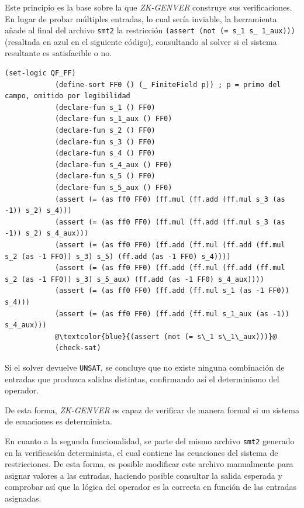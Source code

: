 \documentclass[a4paper,12pt]{report}
\begin{document}
	\vspace{0.2cm}
	\noindent Este principio es la base sobre la que \textit{ZK-GENVER} construye sus verificaciones. En lugar de probar múltiples entradas, lo cual sería inviable, la herramienta añade al final del archivo \texttt{smt2} la restricción \texttt{(assert (not (= s\_1 s\_ 1\_aux)))} (resaltada en azul en el siguiente código), consultando al solver si el sistema resultante es satisfacible o no.
	
	\begin{mi_ejemplo}
		\caption{Archivo \texttt{smt2} generado por el operador \texttt{Igual}}
		\label{lst:smt2-igual-determinista}
		
		\begin{lstlisting}[escapechar=@,
			language={},
			basicstyle=\ttfamily\scriptsize,
			breaklines=true,
			frame=single,
			]
			(set-logic QF_FF)
			(define-sort FF0 () (_ FiniteField p)) ; p = primo del campo, omitido por legibilidad
			(declare-fun s_1 () FF0)
			(declare-fun s_1_aux () FF0)
			(declare-fun s_2 () FF0)
			(declare-fun s_3 () FF0)
			(declare-fun s_4 () FF0)
			(declare-fun s_4_aux () FF0)
			(declare-fun s_5 () FF0)
			(declare-fun s_5_aux () FF0)
			(assert (= (as ff0 FF0) (ff.mul (ff.add (ff.mul s_3 (as -1)) s_2) s_4)))
			(assert (= (as ff0 FF0) (ff.mul (ff.add (ff.mul s_3 (as -1)) s_2) s_4_aux)))
			(assert (= (as ff0 FF0) (ff.add (ff.mul (ff.add (ff.mul s_2 (as -1 FF0)) s_3) s_5) (ff.add (as -1 FF0) s_4))))
			(assert (= (as ff0 FF0) (ff.add (ff.mul (ff.add (ff.mul s_2 (as -1 FF0)) s_3) s_5_aux) (ff.add (as -1 FF0) s_4_aux))))
			(assert (= (as ff0 FF0) (ff.add (ff.mul s_1 (as -1 FF0)) s_4)))
			(assert (= (as ff0 FF0) (ff.add (ff.mul s_1_aux (as -1)) s_4_aux)))
			@\textcolor{blue}{(assert (not (= s\_1 s\_1\_aux)))}@
			(check-sat)
		\end{lstlisting}
	\end{mi_ejemplo}
	
	\vspace{0.2cm}
	\noindent Si el solver devuelve \texttt{UNSAT}, se concluye que no existe ninguna combinación de entradas que produzca salidas distintas, confirmando así el determinismo del operador.
	
	\vspace{0.2cm}
	\noindent De esta forma, \textit{ZK-GENVER} es capaz de verificar de manera formal si un sistema de ecuaciones es determinista.
	
	\vspace{0.2cm}
	\noindent En cuanto a la segunda funcionalidad, se parte del mismo archivo \texttt{smt2} generado en la verificación determinista, el cual contiene las ecuaciones del sistema de restricciones. De esta forma, es posible modificar este archivo manualmente para asignar valores a las entradas, haciendo posible consultar la salida esperada y comprobar así que la lógica del operador es la correcta en función de las entradas asignadas.
	
\end{document}
